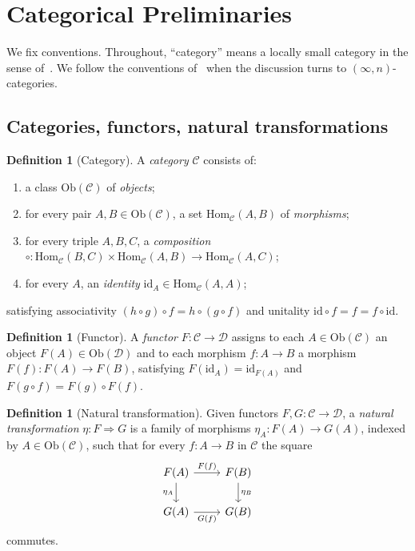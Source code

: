 \documentclass[12pt]{article}
\theoremstyle{definition}
\newtheorem{definition}[theorem]{Definition}
\theoremstyle{remark}
\newcommand{\C}{\mathcal{C}}
\newcommand{\D}{\mathcal{D}}
\newcommand{\id}{\mathrm{id}}
\newcommand{\Hom}{\mathrm{Hom}}
\newcommand{\Ob}{\mathrm{Ob}}
\begin{document}
\section{Categorical Preliminaries}
\label{sec:preliminaries}

We fix conventions. Throughout, ``category'' means a locally small category in the sense of~\cite{maclane1998}. We follow the conventions of~\cite{lurie2009} when the discussion turns to $(\infty,n)$-categories.

\subsection{Categories, functors, natural transformations}

\begin{definition}[Category]
\label{def:category}
A \emph{category} $\C$ consists of:
\begin{enumerate}
\item a class $\Ob(\C)$ of \emph{objects};
\item for every pair $A, B \in \Ob(\C)$, a set $\Hom_\C(A,B)$ of \emph{morphisms};
\item for every triple $A, B, C$, a \emph{composition} $\circ : \Hom_\C(B,C) \times \Hom_\C(A,B) \to \Hom_\C(A,C)$;
\item for every $A$, an \emph{identity} $\id_A \in \Hom_\C(A,A)$;
\end{enumerate}
satisfying associativity $(h \circ g) \circ f = h \circ (g \circ f)$ and unitality $\id \circ f = f = f \circ \id$.
\end{definition}

\begin{definition}[Functor]
A \emph{functor} $F : \C \to \D$ assigns to each $A \in \Ob(\C)$ an object $F(A) \in \Ob(\D)$ and to each morphism $f : A \to B$ a morphism $F(f) : F(A) \to F(B)$, satisfying $F(\id_A) = \id_{F(A)}$ and $F(g \circ f) = F(g) \circ F(f)$.
\end{definition}

\begin{definition}[Natural transformation]
Given functors $F, G : \C \to \D$, a \emph{natural transformation} $\eta : F \Rightarrow G$ is a family of morphisms $\eta_A : F(A) \to G(A)$, indexed by $A \in \Ob(\C)$, such that for every $f : A \to B$ in $\C$ the square
\[
\begin{tikzcd}
F(A) \arrow[r,"F(f)"] \arrow[d,"\eta_A"'] & F(B) \arrow[d,"\eta_B"] \\
G(A) \arrow[r,"G(f)"'] & G(B)
\end{tikzcd}
\]
commutes.
\end{definition}
\end{document}
